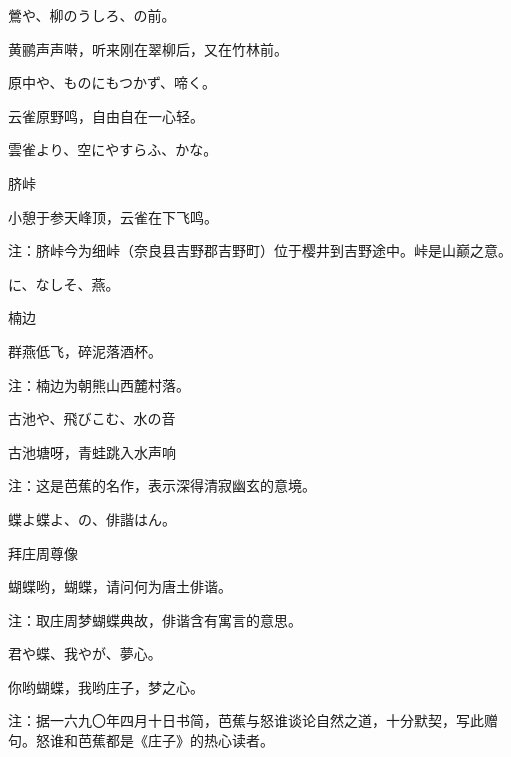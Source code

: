 \begin{haiku}
    {\FH 鶯や、柳のうしろ、の前。}

    {\FK 黄鹂声声啭，听来刚在翠柳后，又在竹林前。}
\end{haiku}

\begin{haiku}
    {\FH 原中や、ものにもつかず、啼く。}

    {\FK 云雀原野鸣，自由自在一心轻。}
\end{haiku}

\begin{haiku}
    {\FH 雲雀より、空にやすらふ、かな。}

    {\FK 脐峠}

    {\FK 小憩于参天峰顶，云雀在下飞鸣。}

    {\FT 注：脐峠今为细峠（奈良县吉野郡吉野町）位于樱井到吉野途中。峠是山巅之意。}
\end{haiku}

\begin{haiku}
    {\FH {}に、なしそ、燕。}

    {\FK 楠边}

    {\FK 群燕低飞，碎泥落酒杯。}

    {\FT 注：楠边为朝熊山西麓村落。}
\end{haiku}

\begin{haiku}
    {\FH 古池や、飛びこむ、水の音}

    {\FK 古池塘呀，青蛙跳入水声响}

    {\FT 注：这是芭蕉的名作，表示深得清寂幽玄的意境。}
\end{haiku}

\begin{haiku}
    {\FH 蝶よ蝶よ、の、俳諧はん。}

    {\FK 拜庄周尊像}

    {\FK 蝴蝶哟，蝴蝶，请问何为唐土俳谐。}

    {\FT 注：取庄周梦蝴蝶典故，俳谐含有寓言的意思。}
\end{haiku}

\begin{haiku}
    {\FH 君や蝶、我やが、夢心。}

    {\FK 你哟蝴蝶，我哟庄子，梦之心。}

    {\FT 注：据一六九〇年四月十日书简，芭蕉与怒谁谈论自然之道，十分默契，写此赠句。怒谁和芭蕉都是《庄子》的热心读者。}
\end{haiku}

